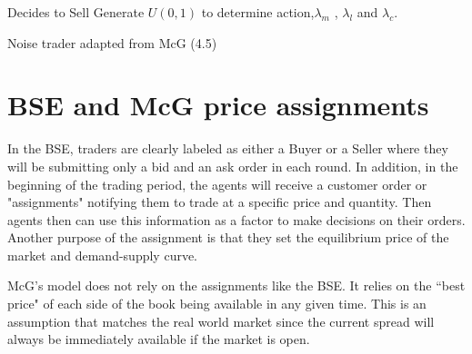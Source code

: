 \begin{algorithm}[H]
\DontPrintSemicolon 
{} {

     {
    Decides to Sell\;
    }
    \EndIf
    Generate $U(0,1)$ to determine action,$\lambda_{m}$ , $\lambda_{l}$ and $\lambda_{c}$.
    
    {
    }
  }
\EndIf
\caption{{\sc Noise trader adapted from McG (4.5) \cite{McGroarty}} }
\end{algorithm}

\section{BSE and McG price assignments}
In the BSE, traders are clearly labeled as either a Buyer or a Seller where they will be submitting only a bid and an ask order in each round. In addition, in the beginning of the trading period, the agents will receive a customer order or "assignments" notifying them to trade at a specific price and quantity. Then agents then can use this information as a factor to make decisions on their orders. Another purpose of the assignment is that they set the equilibrium price of the market and demand-supply curve. 

McG's model does not rely on the assignments like the BSE. It relies on the ``best price" of each side of the book being available in any given time. This is an assumption that matches the real world market since the current spread will always be immediately available if the market is open. 


